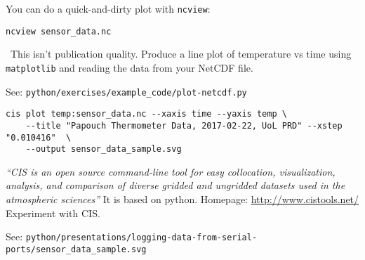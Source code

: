 \documentclass[a4paper,11pt]{article}
\begin{document}
\begin{question}[name=Bonus Exercise]
You can do a quick-and-dirty plot with \texttt{ncview}:\par
\vspace{1em}
\texttt{ncview sensor\_data.nc}\par
\vspace{1em}
\noindent~This isn't publication quality. Produce a line plot of temperature vs time using \texttt{matplotlib}
and reading the data from your NetCDF file.
\end{question}
\begin{solution}
See: \texttt{python/exercises/example\_code/plot-netcdf.py}
\end{solution}
\newsavebox\cisexample
\begin{lrbox}{\cisexample}
\begin{minipage}{\textwidth}
\begin{verbatim}
cis plot temp:sensor_data.nc --xaxis time --yaxis temp \ 
    --title "Papouch Thermometer Data, 2017-02-22, UoL PRD" --xstep "0.010416"  \ 
    --output sensor_data_sample.svg
\end{verbatim}
\end{minipage}
\end{lrbox}
\begin{question}[name=Bonus Exercise]
\emph{``CIS is an open source command-line tool for easy collocation,
visualization, analysis, and comparison of diverse gridded and ungridded
datasets used in the atmospheric sciences''}
\vspace{1em}
It is based on python. Homepage:
\href{http://www.cistools.net/}{http://www.cistools.net/}
\vspace{1em}
\noindent\usebox\cisexample
\vspace{1em}
Experiment with CIS.
\end{question}
\begin{solution}
See: \texttt{python/presentations/logging-data-from-serial-ports/sensor\_data\_sample.svg}
\end{solution}

\newpage
\printsolutions[section]
\end{document}
